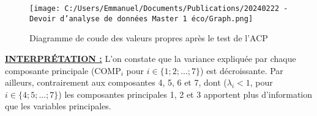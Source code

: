 \begin{figure}[H]
	\centering \texttt{[image: C:/Users/Emmanuel/Documents/Publications/20240222 - Devoir d'analyse de données Master 1 éco/Graph.png]}
	\caption{Diagramme de coude des valeurs propres après le test de l'ACP}
\end{figure}

\noindent \textbf{\underline{INTERPR\'ETATION :}} L'on constate que la variance expliquée par chaque composante principale (COMP$_i$ pour $i\in \{1;2;...;7\}$) est décroissante. Par ailleurs, contrairement aux composantes 4, 5, 6 et 7, dont ($\lambda_i<1$, pour $i\in  \{4;5;...;7\}$) les composantes principales 1, 2 et 3 apportent plus d'information que les variables principales.
